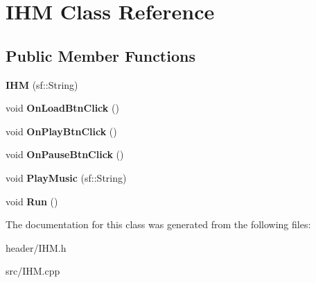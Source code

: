 \hypertarget{classIHM}{}\section{I\+HM Class Reference}
\label{classIHM}
\subsection*{Public Member Functions}
\begin{DoxyCompactItemize}
\item 
{\bfseries I\+HM} (sf\+::\+String)\hypertarget{classIHM_a5b290c1d145ab458a3b784ef9e72a19a}{}\label{classIHM_a5b290c1d145ab458a3b784ef9e72a19a}

\item 
void {\bfseries On\+Load\+Btn\+Click} ()\hypertarget{classIHM_a687eb5337d21c599573be6ffd893e597}{}\label{classIHM_a687eb5337d21c599573be6ffd893e597}

\item 
void {\bfseries On\+Play\+Btn\+Click} ()\hypertarget{classIHM_a16592547174442575a168978b3b4b594}{}\label{classIHM_a16592547174442575a168978b3b4b594}

\item 
void {\bfseries On\+Pause\+Btn\+Click} ()\hypertarget{classIHM_a0b667fafd7cbaaea07a6ff9c1c1fdb22}{}\label{classIHM_a0b667fafd7cbaaea07a6ff9c1c1fdb22}

\item 
void {\bfseries Play\+Music} (sf\+::\+String)\hypertarget{classIHM_a79fc60649754d76d877572d1f7bd4972}{}\label{classIHM_a79fc60649754d76d877572d1f7bd4972}

\item 
void {\bfseries Run} ()\hypertarget{classIHM_a82bd5aa63da77245548a70b73bfd2bb7}{}\label{classIHM_a82bd5aa63da77245548a70b73bfd2bb7}

\end{DoxyCompactItemize}


The documentation for this class was generated from the following files\+:\begin{DoxyCompactItemize}
\item 
header/I\+H\+M.\+h\item 
src/I\+H\+M.\+cpp\end{DoxyCompactItemize}
